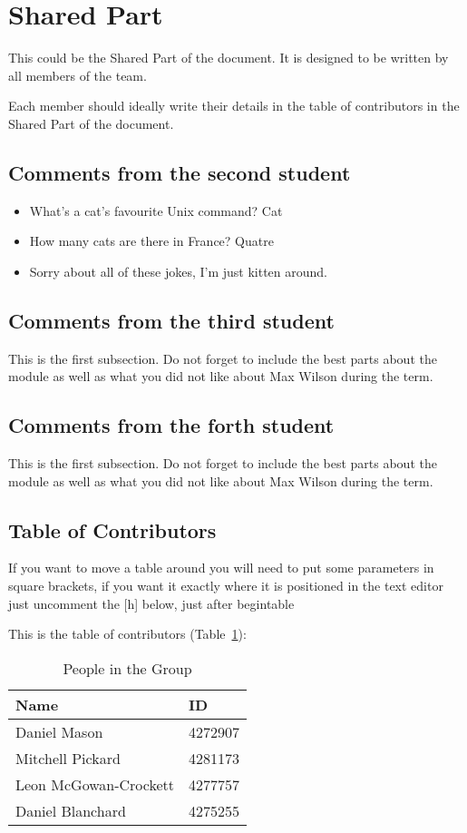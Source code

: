 \section{Shared Part}

This could be the Shared Part of the document. It is designed to be written by all members of the team.

Each member should ideally write their details in the table of contributors in the Shared Part of the document.


\subsection{Comments from the second student}

\begin{itemize}
	\item What's a cat's favourite Unix command? Cat

	\item How many cats are there in France? Quatre

	\item Sorry about all of these jokes, I'm just kitten around.
\end{itemize}

\subsection{Comments from the third student}
This is the first subsection. Do not forget to include the best parts about the module as well as what you did not like about Max Wilson during the term.

\subsection{Comments from the forth student}
This is the first subsection. Do not forget to include the best parts about the module as well as what you did not like about Max Wilson during the term.

\subsection{Table of Contributors}


If you want to move a table around you will need to put some parameters in square brackets, if you want it exactly where it is positioned in the text editor just uncomment the [h] below, just after begin{table}

This is the table of contributors (Table~\ref{authors}):
\begin{table}%
\centering
\caption{People in the Group}
\label{authors}
\begin{tabular}{|l|l|}
\hline
\textbf{Name} & \textbf{ID} \\
\hline
Daniel Mason & 4272907\\
\hline
Mitchell Pickard & 4281173\\
\hline
Leon McGowan-Crockett & 4277757\\
\hline
Daniel Blanchard & 4275255\\
\hline
\end{tabular}
\end{table}